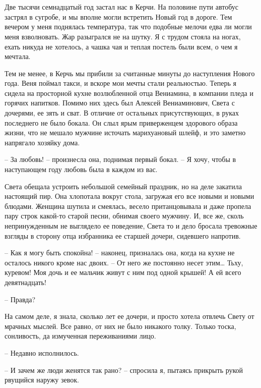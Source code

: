 \documentclass[
]{book}
\begin{document}
\hypertarget{chapter-81}{%
\chapter{~}\label{chapter-81}}

Две тысячи семнадцатый год застал нас в Керчи. На половине пути автобус застрял в сугробе, и мы вполне могли встретить Новый год в дороге. Тем вечером у меня поднялась температура, так что подобные мелочи едва ли могли меня взволновать. Жар разыгрался не на шутку. Я с трудом стояла на ногах, ехать никуда не хотелось, а чашка чая и теплая постель были всем, о чем я мечтала.

Тем не менее, в Керчь мы прибили за считанные минуты до наступления Нового года. Веня поймал такси, и вскоре мои мечты стали реальностью. Теперь я сидела на просторной кухне возлюбленной отца Вениамина, в компании пледа и горячих напитков. Помимо них здесь был Алексей Вениаминович, Света с дочерями, ее зять и сват. В отличие от остальных присутствующих, в руках последнего не было бокала. Он слыл ярым приверженцем здорового образа жизни, что не мешало мужчине источать марихуановый шлейф, и это заметно напрягало хозяйку дома.

-- За любовь! -- произнесла она, поднимая первый бокал. -- Я хочу, чтобы в наступающем году любовь была в каждом из вас.

Света обещала устроить небольшой семейный праздник, но на деле закатила настоящий пир. Она хлопотала вокруг стола, загружая его все новыми и новыми блюдами. Женщина шутила и смеялась, весело пританцовывала и даже пропела пару строк какой-то старой песни, обнимая своего мужчину. И, все же, сколь непринужденным не выглядело ее поведение, Света то и дело бросала тревожные взгляды в сторону отца избранника ее старшей дочери, сидевшего напротив.

-- Как я могу быть спокойна! -- наконец, призналась она, когда на кухне не осталось никого кроме нас двоих. -- От него же постоянно несет этим\ldots{} Тьху, куревом! Моя дочь и ее мальчик живут с ним под одной крышей! А ей всего девятнадцать!

-- Правда?

На самом деле, я знала, сколько лет ее дочери, и просто хотела отвлечь Свету от мрачных мыслей. Все равно, от них не было никакого толку. Только тоска, сонливость, да измученная переживаниями лицо.

-- Недавно исполнилось.

-- И зачем же люди женятся так рано? -- спросила я, пытаясь прикрыть рукой рвущийся наружу зевок.
\end{document}
